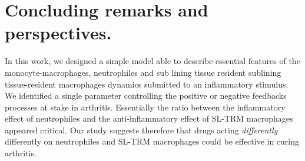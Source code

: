 \documentclass[a4paper, 12pt]{article}
\providecommand{\DIFaddtex}[1]{{\protect\color{blue} \sf #1}} %
\providecommand{\DIFdeltex}[1]{{\protect\color{red} \scriptsize #1}} %
\providecommand{\DIFaddbegin}{} %
\providecommand{\DIFaddend}{} %
\providecommand{\DIFdelbegin}{} %
\providecommand{\DIFdelend}{} %
\providecommand{\DIFadd}[1]{\texorpdfstring{\DIFaddtex{#1}}{#1}} %
\providecommand{\DIFdel}[1]{\texorpdfstring{\DIFdeltex{#1}}{}} %
\begin{document}
\section{Concluding remarks and perspectives.}\label{sec:conclusion} In this work, we designed a simple model able to describe essential features of the monocyte-macrophages, neutrophiles and \DIFdelbegin \DIFdel{sub lining tissue resident }\DIFdelend \DIFaddbegin \DIFadd{sublining tissue-resident }\DIFaddend macrophages dynamics
 submitted to an inflammatory stimulus.
We identified a single parameter controlling the positive or negative feedbacks processes at stake in arthritis. 
Essentially the ratio between the inflammatory effect of neutrophiles and the anti-inflammatory effect of SL-TRM macrophages appeared critical. 
Our study suggests \DIFaddbegin \DIFadd{therefore }\DIFaddend that drugs acting \DIFdelbegin \DIFdel{\emph{differently} }\DIFdelend \DIFaddbegin \DIFadd{differently }\DIFaddend on neutrophiles and SL-TRM macrophages could be effective in curing arthritis.
\end{document}

